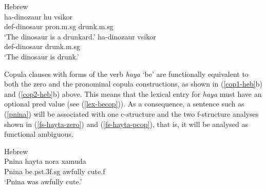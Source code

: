 \documentclass[output=paper,hidelinks]{langscibook}
\begin{document}
\ea \label{ind-stage} Hebrew \citep[236--237]{Falk04} \\
\ea
\gll ha-dinozaur hu v{s}ikor\\
{\sc def}-dinosaur {\sc pron.m.sg} drunk.{\sc m.sg}\\
\glt `The dinosaur is a drunkard.'
\ex
\gll ha-dinozaur v{s}ikor\\
{\sc def}-dinosaur drunk.{\sc m.sg}\\
\glt `The dinosaur is drunk.'
\z
\z

Copula clauses with forms of the verb {\em haya} `be'  are functionally equivalent to both
the zero and the pronominal copula  constructions, as shown in (\ref{cop1-heb}b) and (\ref{cop2-heb}b) above. This means that the lexical entry for {\em haya} must have an optional {\sc pred} value (see  (\ref{lex-becop})). As a consequence, a sentence such as (\ref{pnina}) will be associated with one c-structure and the two f-structure analyses shown in (\ref{fs-hayta-zero}) and (\ref{fs-hayta-pcop}), that is, it will be analysed as functional ambiguous.


\ea  \label{lex-becop}
\z




\ea\label{pnina} Hebrew \citep[227]{Falk04}\\
\gll  Pnina hayta nora xamuda\\
Pnina be.{\sc pst.3f.sg} awfully cute.{\sc f}\\
\glt `Pnina was awfully cute.'
\z




\end{document}
